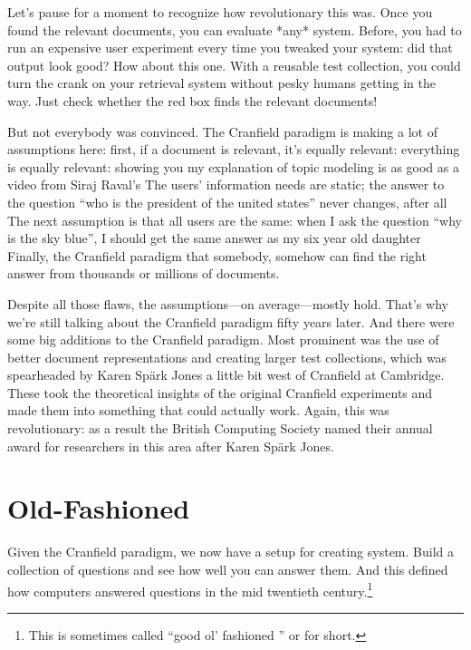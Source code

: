 Let’s pause for a moment to recognize how revolutionary this was.  Once you found the relevant documents, you can evaluate *any* system.  Before, you had to run an expensive user experiment every time you tweaked your system: did that output look good?  How about this one.  With a reusable test collection, you could turn the crank on your retrieval system without pesky humans getting in the way.  Just check whether the red box finds the relevant documents!

But not everybody was convinced.  The Cranfield paradigm is making a lot of assumptions here: 
first, if a document is relevant, it’s equally relevant: everything is equally relevant: showing you my explanation of topic modeling is as good as a video from Siraj Raval’s
The users’ information needs are static; the answer to the question “who is the president of the united states” never changes, after all
The next assumption is that all users are the same: when I ask the question “why is the sky blue”, I should get the same answer as my six year old daughter
Finally, the Cranfield paradigm that somebody, somehow can find the right answer from thousands or millions of documents.

Despite all those flaws, the assumptions—on average—mostly hold.  That’s why we’re still talking about the Cranfield paradigm fifty years later.  And there were some big additions to the Cranfield paradigm.  Most prominent was the use of better document representations and creating larger test collections, which was spearheaded by Karen Spärk Jones a little bit west of Cranfield at Cambridge.  These took the theoretical insights of the original Cranfield experiments and made them into something that could actually work.  Again, this was revolutionary: as a result the British Computing Society named their annual award for researchers in this area after Karen Spärk Jones.

\section{Old-Fashioned }
\label{sec:ir:gofai-qa}

Given the Cranfield paradigm, we now have a setup for creating 
system.
%
Build a collection of questions and see how well you can answer them.
%
And this defined how computers answered questions in the mid twentieth
century.\footnote{This is sometimes called ``good ol' fashioned '' or
   for short.}

